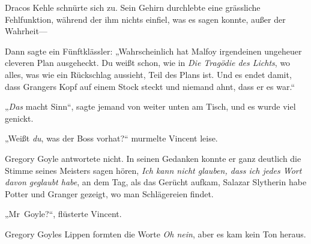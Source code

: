 Dracos Kehle schnürte sich zu. Sein Gehirn durchlebte eine grässliche Fehlfunktion, während der ihm nichts einfiel, was es sagen konnte, außer der Wahrheit—

Dann sagte ein Fünftklässler: „Wahrscheinlich hat Malfoy irgendeinen ungeheuer cleveren Plan ausgeheckt. Du weißt schon, wie in \emph{Die Tragödie des Lichts}, wo alles, was wie ein Rückschlag aussieht, Teil des Plans ist. Und es endet damit, dass Grangers Kopf auf einem Stock steckt und niemand ahnt, dass er es war.“

„\emph{Das} macht Sinn“, sagte jemand von weiter unten am Tisch, und es wurde viel genickt.

\later

„Weißt \emph{du}, was der Boss vorhat?“ murmelte Vincent leise.

Gregory Goyle antwortete nicht. In seinen Gedanken konnte er ganz deutlich die Stimme seines Meisters sagen hören, \emph{Ich kann nicht glauben, dass ich jedes Wort davon geglaubt habe}, an dem Tag, als das Gerücht aufkam, Salazar Slytherin habe Potter und Granger gezeigt, wo man Schlägereien findet.

„Mr~Goyle?“, flüsterte Vincent.

Gregory Goyles Lippen formten die Worte \emph{Oh nein}, aber es kam kein Ton heraus.

\later

